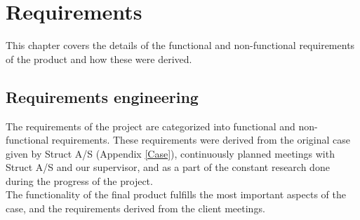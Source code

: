 
\chapter{Requirements} %

\label{Chapter3} %

This chapter covers the details of the functional and non-functional requirements of the product and how these were derived.

\section{Requirements engineering}
The requirements of the project are categorized into functional and non-functional requirements. These requirements were derived from the original case given by Struct A/S (Appendix \ref{Case}), continuously planned meetings with Struct A/S and our supervisor, and as a part of the constant research done during the progress of the project. \\
The functionality of the final product fulfills the most important aspects of the case, and the requirements derived from the client meetings.

